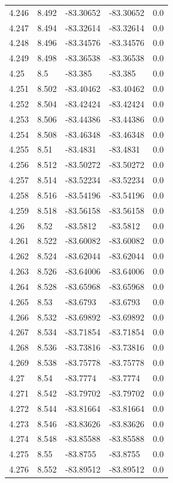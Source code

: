 \begin{tabular}{lllll}
4.246 & 8.492 & -83.30652 & -83.30652 & 0.0 \\
4.247 & 8.494 & -83.32614 & -83.32614 & 0.0 \\
4.248 & 8.496 & -83.34576 & -83.34576 & 0.0 \\
4.249 & 8.498 & -83.36538 & -83.36538 & 0.0 \\
4.25 & 8.5 & -83.385 & -83.385 & 0.0 \\
4.251 & 8.502 & -83.40462 & -83.40462 & 0.0 \\
4.252 & 8.504 & -83.42424 & -83.42424 & 0.0 \\
4.253 & 8.506 & -83.44386 & -83.44386 & 0.0 \\
4.254 & 8.508 & -83.46348 & -83.46348 & 0.0 \\
4.255 & 8.51 & -83.4831 & -83.4831 & 0.0 \\
4.256 & 8.512 & -83.50272 & -83.50272 & 0.0 \\
4.257 & 8.514 & -83.52234 & -83.52234 & 0.0 \\
4.258 & 8.516 & -83.54196 & -83.54196 & 0.0 \\
4.259 & 8.518 & -83.56158 & -83.56158 & 0.0 \\
4.26 & 8.52 & -83.5812 & -83.5812 & 0.0 \\
4.261 & 8.522 & -83.60082 & -83.60082 & 0.0 \\
4.262 & 8.524 & -83.62044 & -83.62044 & 0.0 \\
4.263 & 8.526 & -83.64006 & -83.64006 & 0.0 \\
4.264 & 8.528 & -83.65968 & -83.65968 & 0.0 \\
4.265 & 8.53 & -83.6793 & -83.6793 & 0.0 \\
4.266 & 8.532 & -83.69892 & -83.69892 & 0.0 \\
4.267 & 8.534 & -83.71854 & -83.71854 & 0.0 \\
4.268 & 8.536 & -83.73816 & -83.73816 & 0.0 \\
4.269 & 8.538 & -83.75778 & -83.75778 & 0.0 \\
4.27 & 8.54 & -83.7774 & -83.7774 & 0.0 \\
4.271 & 8.542 & -83.79702 & -83.79702 & 0.0 \\
4.272 & 8.544 & -83.81664 & -83.81664 & 0.0 \\
4.273 & 8.546 & -83.83626 & -83.83626 & 0.0 \\
4.274 & 8.548 & -83.85588 & -83.85588 & 0.0 \\
4.275 & 8.55 & -83.8755 & -83.8755 & 0.0 \\
4.276 & 8.552 & -83.89512 & -83.89512 & 0.0 \\

\end{tabular}
